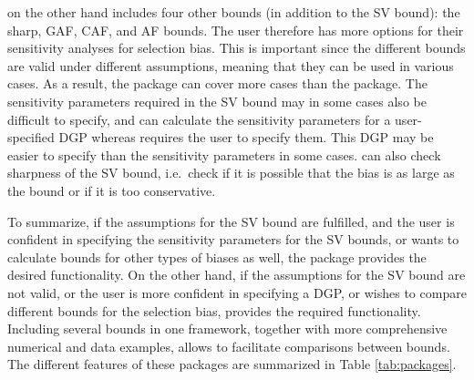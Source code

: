  on the other hand includes four other bounds (in
addition to the SV bound): the sharp, GAF, CAF, and AF bounds. The user
therefore has more options for their sensitivity analyses for selection bias.
This is important since the different bounds are valid under different
assumptions, meaning that they can be used in various cases. As a result, the
package  can cover more cases than the 
package. The sensitivity parameters required in the SV bound may in some cases
also be difficult to specify, and  can calculate the
sensitivity parameters for a user-specified DGP whereas 
requires the user to specify them. This
DGP may be easier to specify than the sensitivity parameters in some cases.
 can also check sharpness of the SV bound, i.e.~check if
it is possible that the bias is as large as the bound or if it is too conservative.

To summarize, if the assumptions for the SV bound are fulfilled, and the user
is confident in specifying the sensitivity parameters for the SV bounds, or
wants to calculate bounds for other types of biases as well, the package
 provides the desired functionality. On the other hand, if the
assumptions for the SV bound are not valid, or the user is more confident in
specifying a DGP, or wishes to compare different bounds for the selection bias,
 provides the required functionality. Including several
bounds in one framework, together with more comprehensive numerical and data
examples, allows  to facilitate comparisons between
bounds. The different features of these
packages are summarized in Table \ref{tab:packages}.

\newpage

